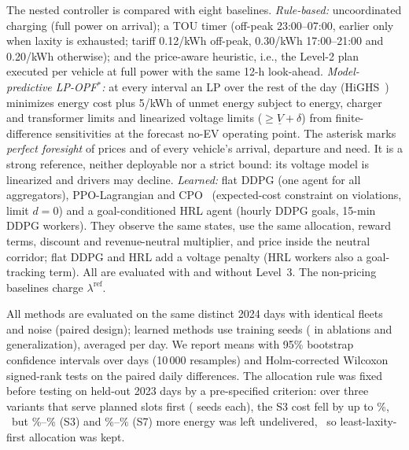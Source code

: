 \documentclass[journal]{IEEEtran}
\newcommand{\vlim}{\underline{V}}
\begin{document}
\begin{table}[t]
\centering
\caption{Evaluation Scenarios (Penetration: EVs per Household)}
\label{tab:scendef}
\footnotesize

\end{table}

The nested controller is compared with eight baselines. \emph{Rule-based:}
uncoordinated charging (full power on arrival); a TOU timer (off-peak
23:00--07:00, earlier only when laxity is exhausted; tariff
\text{\euro}0.12/kWh off-peak, \text{\euro}0.30/kWh 17:00--21:00 and
\text{\euro}0.20/kWh otherwise); and the price-aware heuristic, i.e., the
Level-2 plan executed per vehicle at full power with the same 12-h look-ahead.
\emph{Model-predictive LP-OPF$^\ast$:} at every interval an LP over the rest of
the day (HiGHS~\cite{huangfu2018}) minimizes energy cost plus
\text{\euro}5/kWh of unmet energy subject to energy, charger and transformer
limits and linearized voltage limits ($\ge\vlim+\delta$) from
finite-difference sensitivities at the forecast no-EV operating point. The
asterisk marks \emph{perfect foresight} of prices and of every vehicle's
arrival, departure and need. It is a strong reference, neither deployable nor a
strict bound: its voltage model is linearized and drivers may decline.
\emph{Learned:} flat DDPG (one agent for all aggregators), PPO-Lagrangian and
CPO~\cite{achiam2017} (expected-cost constraint on violations, limit $d=0$) and
a goal-conditioned HRL agent (hourly DDPG goals, 15-min DDPG workers). They
observe the same states, use the same allocation, reward terms, discount and
revenue-neutral multiplier, and price inside the neutral corridor; flat DDPG
and HRL add a voltage penalty (HRL workers also a goal-tracking term). All are
evaluated with and without Level~3. The non-pricing baselines charge
$\lambda^{\mathrm{ref}}$.

All methods are evaluated on the same \GEvalDays{} distinct 2024 days with
identical fleets and noise (paired design); learned methods use
\GTrainSeedsWord{} training seeds (\GAuxSeedsWord{} in ablations and
generalization), averaged per day. We report means with 95\% bootstrap
confidence intervals over days (10\,000 resamples) and Holm-corrected Wilcoxon
signed-rank tests on the paired daily differences. The allocation rule was
fixed before testing on \GTuneValDays{} held-out 2023 days by a pre-specified
criterion: over three variants that serve planned slots first
(\GTuneSeedsWord{} seeds each), the S3 cost fell by up to
\GTuneCostReductionMax\%,%
\ but \GTuneUnmetIncreaseMinSThree\%--\GTuneUnmetIncreaseMaxSThree\% (S3) and
\GTuneUnmetIncreaseMinSSeven\%--\GTuneUnmetIncreaseMaxSSeven\% (S7) more energy
was left undelivered,%
\ so least-laxity-first allocation was kept.%
\end{document}
